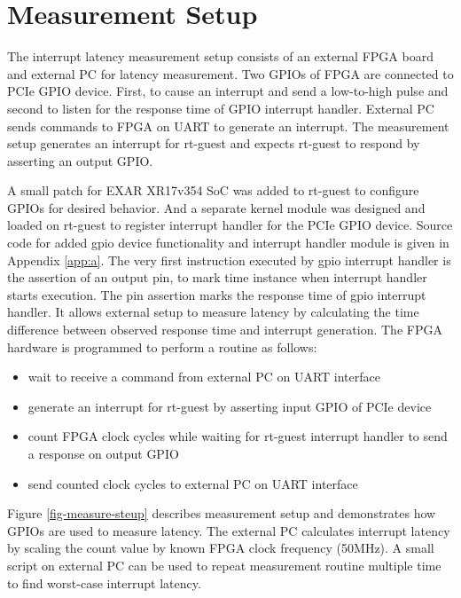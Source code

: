 \section{Measurement Setup} \label{sec:measurement-setup}
The interrupt latency measurement setup consists of an external FPGA board \cite{terasic-de0nano} and external PC for latency measurement.
Two GPIOs of FPGA are connected to PCIe GPIO device. 
First, to cause an interrupt and send a low-to-high pulse and second to listen for the
response time of GPIO interrupt handler. External PC sends commands to FPGA on UART to generate an interrupt.
The measurement setup generates an interrupt for rt-guest and expects rt-guest to respond by asserting an output GPIO.

A small patch for EXAR XR17v354 SoC was added to rt-guest to configure GPIOs for desired behavior.
And a separate kernel module was designed and loaded on rt-guest to register interrupt handler for the PCIe GPIO device.
Source code for added gpio device functionality and interrupt handler module is given in Appendix \ref{app:a}.
The very first instruction executed by gpio interrupt handler is the assertion of an output pin, to mark time instance when interrupt handler starts execution.
The pin assertion marks the response time of gpio interrupt handler.
It allows external setup to measure latency by calculating the time difference between observed response time and interrupt generation.
The FPGA hardware is programmed to perform a routine as follows:
\begin {itemize}
	\item {wait to receive a command from external PC on UART interface}
	\item {generate an interrupt for rt-guest by asserting input GPIO of PCIe device}
	\item {count FPGA clock cycles while waiting for rt-guest interrupt handler to send a response on output GPIO}
	\item {send counted clock cycles to external PC on UART interface}
\end {itemize}

Figure \ref{fig-measure-steup} describes measurement setup and demonstrates how GPIOs are used to measure latency.
The external PC calculates interrupt latency by scaling the count value by known FPGA clock frequency (50MHz). 
A small script on external PC can be used to repeat measurement routine multiple time to find worst-case interrupt latency.





